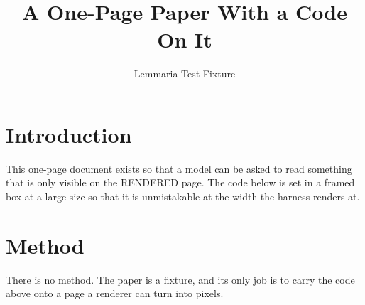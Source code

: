 \documentclass[11pt]{article}
\title{A One-Page Paper With a Code On It}
\author{Lemmaria Test Fixture}
\date{}
\begin{document}
\maketitle

\section{Introduction}
This one-page document exists so that a model can be asked to read something
that is only visible on the RENDERED page. The code below is set in a framed
box at a large size so that it is unmistakable at the width the harness
renders at.

\vspace{1.5em}
\begin{center}
\end{center}
\vspace{1.5em}

\section{Method}
There is no method. The paper is a fixture, and its only job is to carry the
code above onto a page a renderer can turn into pixels.
\end{document}
